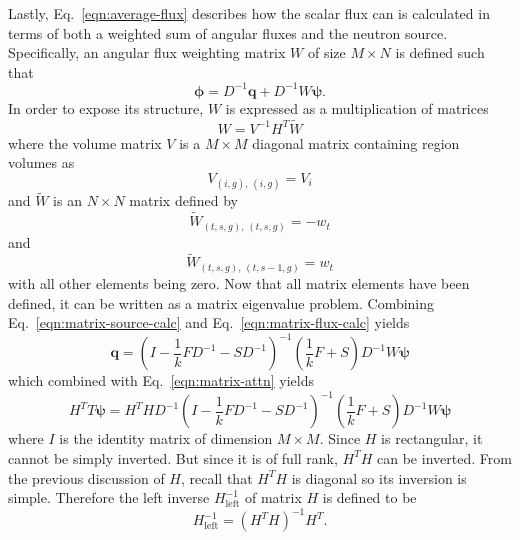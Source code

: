 Lastly, Eq.~\ref{eqn:average-flux} describes how the scalar flux can is calculated in terms of both a weighted sum of angular fluxes and the neutron source. Specifically, an angular flux weighting matrix $W$ of size $M \times N$ is defined such that
\begin{equation}
\boldsymbol{\phi} = D^{-1}\mathbf{q} + D^{-1} W \boldsymbol{\psi}.
\label{eqn:matrix-flux-calc}
\end{equation}
In order to expose its structure, $W$ is expressed as a multiplication of matrices
\begin{equation}
W = V^{-1} H^T \tilde{W}
\end{equation}
where the volume matrix $V$ is a $M \times M$ diagonal matrix containing region volumes as
\begin{equation}
V_{\left(i, g\right), \, \left(i, g\right)} = V_i
\end{equation}
and $\tilde{W}$ is an $N \times N$ matrix defined by
\begin{equation}
\tilde{W}_{\left(t,s,g\right), \, \left(t, s, g\right)} = -w_{t}
\end{equation}
and
\begin{equation}
\tilde{W}_{\left(t,s,g\right), \, \left(t, s-1, g\right)} = w_{t}
\end{equation}
with all other elements being zero. Now that all matrix elements have been defined, it can be written as a matrix eigenvalue problem. Combining Eq.~\ref{eqn:matrix-source-calc} and Eq.~\ref{eqn:matrix-flux-calc} yields
\begin{equation}
\mathbf{q} = \left(I - \frac{1}{k} F D^{-1} - S D^{-1} \right)^{-1} \left(\frac{1}{k} F + S \right) D^{-1} W \boldsymbol{\psi}
\end{equation}
which combined with Eq.~\ref{eqn:matrix-attn} yields
\begin{equation}
H^T T \boldsymbol{\psi} = H^T H D^{-1} \left(I - \frac{1}{k} F D^{-1} - S D^{-1} \right)^{-1} \left(\frac{1}{k} F + S \right) D^{-1} W \boldsymbol{\psi}
\end{equation}
where $I$ is the identity matrix of dimension $M \times M$. Since $H$ is rectangular, it cannot be simply inverted. But since it is of full rank, $H^T H$ can be inverted. From the previous discussion of $H$, recall that $H^T H$ is diagonal so its inversion is simple. Therefore the left inverse $H_{\text{left}}^{-1}$ of matrix $H$ is defined to be
\begin{equation}
H_{\text{left}}^{-1} = \left(H^T H\right)^{-1} H^T.
\end{equation}
